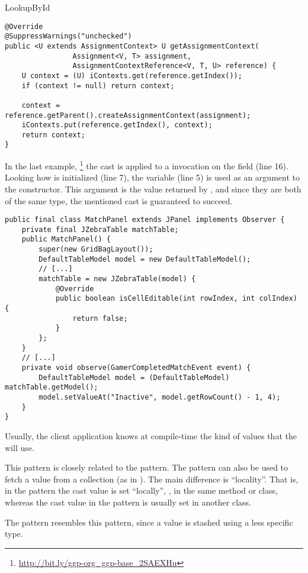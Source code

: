 \begin{pattern}{LookupById}
\begin{verbatim}
@Override
@SuppressWarnings("unchecked")
public <U extends AssignmentContext> U getAssignmentContext(
                Assignment<V, T> assignment,
                AssignmentContextReference<V, T, U> reference) {
    U context = (U) iContexts.get(reference.getIndex());
    if (context != null) return context;
    
    context = reference.getParent().createAssignmentContext(assignment);
    iContexts.put(reference.getIndex(), context);
    return context;
}
\end{verbatim}

In the last example,%
\footnote{\url{http://bit.ly/ggp-org_ggp-base_2SAEXHu}}
the cast is applied to a  invocation on the  field (line 16).
Looking how  is initialized (line 7),
the  variable (line 5) is used as an argument to the constructor.
This argument is the value returned by ,
and since they are both of the same type,
the mentioned cast is guaranteed to succeed.

\begin{verbatim}
public final class MatchPanel extends JPanel implements Observer {
    private final JZebraTable matchTable;
    public MatchPanel() {
        super(new GridBagLayout());
        DefaultTableModel model = new DefaultTableModel();
        // [...]
        matchTable = new JZebraTable(model) {
            @Override
            public boolean isCellEditable(int rowIndex, int colIndex) {
                return false;
            }
        };
    }
    // [...]
    private void observe(GamerCompletedMatchEvent event) {
        DefaultTableModel model = (DefaultTableModel) matchTable.getModel();
        model.setValueAt("Inactive", model.getRowCount() - 1, 4);
    }
}
\end{verbatim}

Usually, the client application knows at compile-time the kind of values that the \thisp{} will use.

This pattern is closely related to the  pattern.
The \thisp{} pattern can also be used to fetch a value from a collection (as in ).
The main difference is ``locality''.
That is, in the \thisp{} pattern the cast value is set ``locally'', \ie,
in the same method or class,
whereas the cast value in the  pattern is usually set in another class.

The  pattern resembles this pattern,
since a value is stashed using a less specific type.





\end{pattern}
